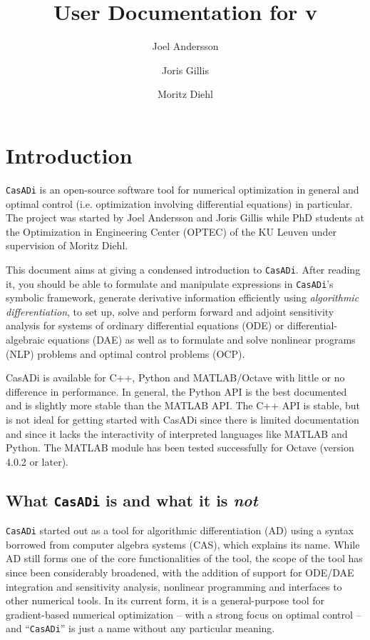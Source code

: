 \documentclass[a4paper,12pt]{book}
\author{Joel Andersson \and Joris Gillis \and Moritz Diehl}
\title{User Documentation for \CasADi v\currentversion}
\newcommand{\CasADi}{\texttt{CasADi}\xspace}
\begin{document}
\titlepage
\maketitle
\begin{latexonly}
\tableofcontents
\end{latexonly}
\clearpage

\chapter{Introduction}
\CasADi is an open-source software tool for numerical optimization in general and optimal control
(i.e. optimization involving differential equations) in particular. The project was started by
Joel Andersson and Joris Gillis while PhD students at the Optimization in Engineering Center
(OPTEC) of the KU Leuven under supervision of Moritz Diehl.

This document aims at giving a condensed introduction to \CasADi. After reading it, you should be able to formulate and manipulate expressions in \CasADi's symbolic framework, generate derivative information efficiently using \emph{algorithmic differentiation}, to set up, solve and perform forward and adjoint sensitivity analysis for systems of ordinary differential equations (ODE) or differential-algebraic equations (DAE) as well as to formulate and solve nonlinear programs (NLP) problems and optimal control problems (OCP).

CasADi is available for C++, Python and MATLAB/Octave with little or no difference in performance. In general, the Python API is the best documented and is slightly more stable than the MATLAB API. The C++ API is stable, but is not ideal for getting started with CasADi since there is limited documentation and since it lacks the interactivity of interpreted languages like MATLAB and Python. The MATLAB module has been tested successfully for Octave (version 4.0.2 or later).

\section{What \CasADi is and what it is \emph{not}}
\CasADi started out as a tool for algorithmic differentiation (AD) using a syntax borrowed from computer algebra systems (CAS), which explains its name. While AD still forms one of the core functionalities of the tool, the scope of the tool has since been considerably broadened, with the addition of support for ODE/DAE integration and sensitivity analysis, nonlinear programming and interfaces to other numerical tools. In its current form, it is a general-purpose tool for gradient-based numerical optimization -- with a strong focus on optimal control -- and ``\CasADi'' is just a name without any particular meaning.
\end{document}
